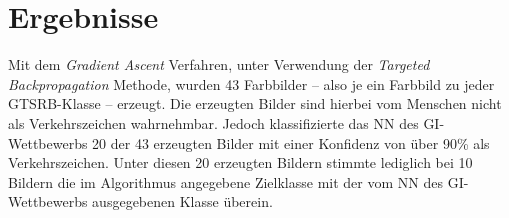 %
%
%
%
%
%


\section{Ergebnisse}
Mit dem \textit{Gradient Ascent} Verfahren, unter Verwendung der \textit{Targeted Backpropagation} Methode, wurden 43 Farbbilder – also je ein Farbbild zu jeder \ac{GTSRB}-Klasse – erzeugt. 
Die erzeugten Bilder sind hierbei vom Menschen nicht als Verkehrszeichen wahrnehmbar. Jedoch klassifizierte das \ac{NN} des \ac{GI}-Wettbewerbs 20 der 43 erzeugten Bilder mit einer Konfidenz von über 90\% als Verkehrszeichen. 
Unter diesen 20 erzeugten Bildern stimmte lediglich bei 10 Bildern die im Algorithmus angegebene Zielklasse mit der vom \ac{NN} des \ac{GI}-Wettbewerbs ausgegebenen Klasse überein.


~\newline



